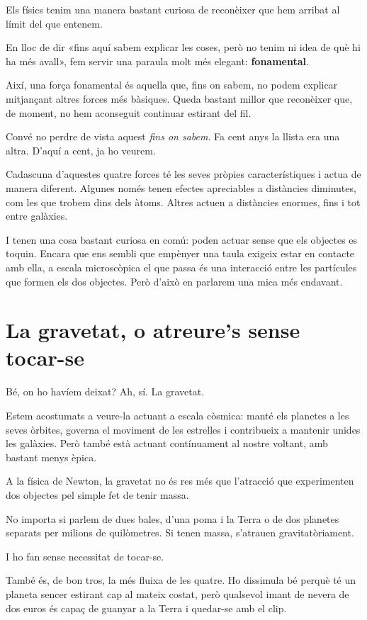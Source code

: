 Els físics tenim una manera bastant curiosa de reconèixer que hem arribat al límit del que entenem.

En lloc de dir «fins aquí sabem explicar les coses, però no tenim ni idea de què hi ha més avall», fem servir una paraula molt més elegant: \textbf{fonamental}.

Així, una força fonamental és aquella que, fins on sabem, no podem explicar mitjançant altres forces més bàsiques. Queda bastant millor que reconèixer que, de moment, no hem aconseguit continuar estirant del fil.

Convé no perdre de vista aquest \textit{fins on sabem}. Fa cent anys la llista era una altra. D'aquí a cent, ja ho veurem.

Cadascuna d'aquestes quatre forces té les seves pròpies característiques i actua de manera diferent. Algunes només tenen efectes apreciables a distàncies diminutes, com les que trobem dins dels àtoms. Altres actuen a distàncies enormes, fins i tot entre galàxies.

I tenen una cosa bastant curiosa en comú: poden actuar sense que els objectes es toquin. Encara que ens sembli que empènyer una taula exigeix estar en contacte amb ella, a escala microscòpica el que passa és una interacció entre les partícules que formen els dos objectes. Però d'això en parlarem una mica més endavant.

\section{La gravetat, o atreure's sense tocar-se}

Bé, on ho havíem deixat? Ah, sí. La gravetat.

Estem acostumats a veure-la actuant a escala còsmica: manté els planetes a les seves òrbites, governa el moviment de les estrelles i contribueix a mantenir unides les galàxies. Però també està actuant contínuament al nostre voltant, amb bastant menys èpica.

A la física de Newton, la gravetat no és res més que l'atracció que experimenten dos objectes pel simple fet de tenir massa.

No importa si parlem de dues bales, d'una poma i la Terra o de dos planetes separats per milions de quilòmetres. Si tenen massa, s'atrauen gravitatòriament.

I ho fan sense necessitat de tocar-se.

També és, de bon tros, la més fluixa de les quatre. Ho dissimula bé perquè té un planeta sencer estirant cap al mateix costat, però qualsevol imant de nevera de dos euros és capaç de guanyar a la Terra i quedar-se amb el clip.

